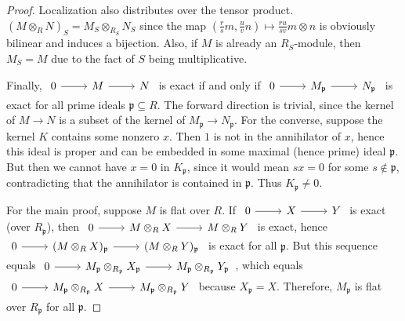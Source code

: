 \documentclass[10pt]{article}
\newcommand{\p}{\mathfrak{p}}
\begin{document}
\begin{enumerate}
\begin{enumerate}
\begin{proof}
Localization also distributes over the tensor product.  $(M \otimes_R N)_S = M_S \otimes_{R_S} N_S$ since the map $(\frac{r}{s}m, \frac{u}{v}n) \mapsto \frac{ru}{sv} m \otimes n$ is obviously bilinear and induces a bijection.  Also, if $M$ is already an $R_S$-module, then $M_S = M$ due to the fact of $S$ being multiplicative.

Finally, $\begin{tikzcd} 0 \arrow[r] & M \arrow[r] & N \end{tikzcd}$ is exact if and only if $\begin{tikzcd} 0 \arrow[r] & M_\p \arrow[r] & N_\p \end{tikzcd}$ is exact for all prime ideals $\p \subseteq R$.  The forward direction is trivial, since the kernel of $M \rightarrow N$ is a subset of the kernel of $M_\p \rightarrow N_\p$.  For the converse, suppose the kernel $K$ contains some nonzero $x$.  Then $1$ is not in the annihilator of $x$, hence this ideal is proper and can be embedded in some maximal (hence prime) ideal $\p$.  But then we cannot have $x = 0$ in $K_\p$, since it would mean $sx = 0$ for some $s \not \in \p$, contradicting that the annihilator is contained in $\p$.  Thus $K_\p \neq 0$.

For the main proof, suppose $M$ is flat over $R$.  If $\begin{tikzcd} 0 \arrow[r] & X \arrow[r] & Y \end{tikzcd}$ is exact (over $R_\p$), then \break $\begin{tikzcd} 0 \arrow[r] & M \otimes_R X \arrow[r] & M \otimes_R Y \end{tikzcd}$ is exact, hence $\begin{tikzcd} 0 \arrow[r] & (M \otimes_R X)_\p \arrow[r] & (M \otimes_R Y)_\p \end{tikzcd}$ is exact for all $\p$.  But this sequence equals $\begin{tikzcd} 0 \arrow[r] & M_\p \otimes_{R_\p} X_\p \arrow[r] & M_\p \otimes_{R_\p} Y_\p \end{tikzcd}$, which equals $\begin{tikzcd} 0 \arrow[r] & M_\p \otimes_{R_\p} X \arrow[r] & M_\p \otimes_{R_\p} Y \end{tikzcd}$ because $X_\p = X$.  Therefore, $M_\p$ is flat over $R_\p$ for all $\p$.


\end{proof}
\end{enumerate}
\end{enumerate}
\end{document}
